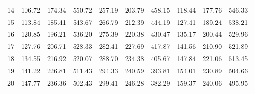 \begin{center}
\begin{longtable}{|l |l l l |l l l |l l l|}
    14&106.72&174.34&550.72&257.19&203.79&458.15&118.44&177.76&546.33\\
    15&113.84&185.41&543.67&266.79&212.39&444.19&127.41&189.24&538.21\\
    16&120.85&196.21&536.20&275.39&220.38&430.47&135.17&200.44&529.96\\
    17&127.76&206.71&528.33&282.41&227.69&417.87&141.56&210.90&521.89\\
    18&134.55&216.92&520.07&288.70&234.38&405.67&147.84&221.06&513.45\\
    19&141.22&226.81&511.43&294.33&240.59&393.81&154.01&230.89&504.66\\
    20&147.77&236.36&502.43&299.41&246.28&382.29&159.37&240.06&495.95\\
    \hline
    \end{longtable}
\end{center}

\newpage